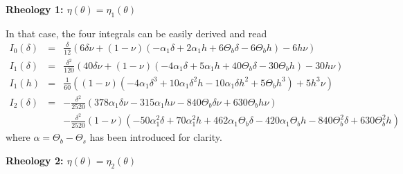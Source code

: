 \vspace{.5cm} \textbf{Rheology 1: $\eta(\theta)=\eta_1(\theta)$} \vspace{.5cm}

In that case, the four integrals can be easily derived and read
\begin{eqnarray}
I_0(\delta)&=&\frac{\delta}{12} \left(6 \delta \nu + (1-\nu) \left(- \alpha_1 \delta + 2 \alpha_1 h + 6 \Theta_{b} \delta - 6 \Theta_{b} h\right) - 6 h \nu\right)\nonumber\\
I_1(\delta)&=&\frac{\delta^{2}}{120} \left(40 \delta \nu + (1-\nu) \left(- 4 \alpha_1 \delta + 5 \alpha_1 h + 40 \Theta_{b} \delta - 30 \Theta_{b} h\right) - 30 h \nu\right)\nonumber\\
I_1(h)&=&\frac{1}{60} \left((1-\nu) \left(- 4 \alpha_1 \delta^{3} + 10 \alpha_1 \delta^{2} h - 10 \alpha_1 \delta h^{2} + 5 \Theta_{b} h^{3}\right) + 5 h^{3} \nu\right)\nonumber\\
I_2(\delta)&=&- \frac{\delta^{2}}{2520} \left(378  \alpha_1 \delta \nu -
               315  \alpha_1 h  \nu -  840 \Theta_{b}  \delta \nu  + 630
               \Theta_{b} h \nu \right)\nonumber\\
&&-\frac{\delta^{2}}{2520}(1-\nu)  \left(- 50  \alpha_1^{2} \delta  + 70
    \alpha_1^{2}  h  +  462  \alpha_1   \Theta_{b}  \delta  -  420  \alpha_1
    \Theta_{b}  h -  840  \Theta_{b}^{2} \delta  + 630  \Theta_{b}^{2}
    h\right)\nonumber
\end{eqnarray}
where $\alpha=\Theta_b-\Theta_s$ has been introduced for clarity.

\vspace{.5cm}   \textbf{Rheology   2:   $\eta(\theta)=\eta_2(\theta)$}
\vspace{.5cm}

